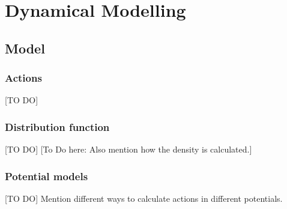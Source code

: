 \documentclass[12pt,preprint]{aastex}
\begin{document}
\section{Dynamical Modelling}

\subsection{Model}

\subsubsection{Actions}

[TO DO]


\subsubsection{Distribution function} \label{sec:qDF}

[TO DO] [To Do here: Also mention how the density is calculated.]

\subsubsection{Potential models}  \label{sec:potentials}

[TO DO] Mention different ways to calculate actions in different potentials.
\end{document}
